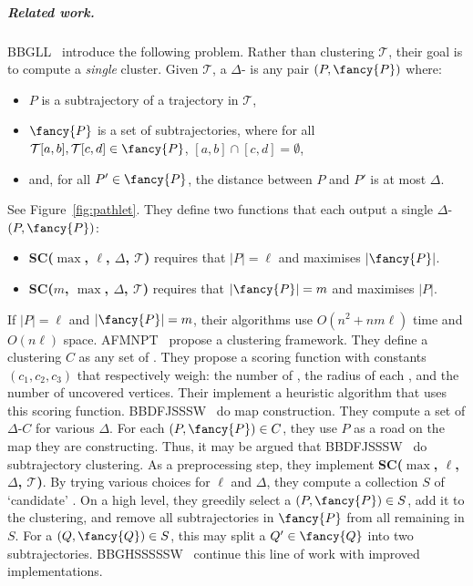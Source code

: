 %
\subparagraph{Related work. }
BBGLL~\cite{buchin2011detecting} introduce the following problem. 
Rather than clustering $\mathcal{T}$, their goal is to compute a \emph{single} cluster. Given $\mathcal{T}$,  a $\Delta$-\emph{\pathlet} is any pair $(P, {\fancy{P}})$ where:
%
\begin{itemize}
    \item $P$ is a subtrajectory of a trajectory in $\mathcal{T}$,
    \item ${\fancy{P}}$ is a set of subtrajectories, where for all $\mathcal{T}[a, b], \mathcal{T}[c, d] \in {\fancy{P}}$, $[a, b] \cap [c, d] = \emptyset$,
    \item and, for all $P' \in {\fancy{P}}$, the \frechet distance between $P$ and $P'$ is at most $\Delta$. 
\end{itemize}
%
See Figure~\ref{fig:pathlet}.
They define two functions that each output a single $\Delta$-\pathlet $(P, {\fancy{P}})$:
%
\begin{itemize}
    \item \textbf{SC($\max$, $\ell$, $\Delta$, $\mathcal{T}$)} requires that $|P| = \ell$ and maximises $|{\fancy{P}}|$.
    \item \textbf{SC($m$, $\max$, $\Delta$, $\mathcal{T}$)}  requires  that $|{\fancy{P}}| = m$ and maximises $|P|$. 
\end{itemize}
%
  If $|P| = \ell$ and $|{\fancy{P}}| = m$, their algorithms use $O(n^2 + n m \ell)$ time and $O(n \ell)$ space.
%
%
AFMNPT~\cite{agarwal2018subtrajectory} propose a clustering framework.
They define a clustering $C$ as any set of \pathlets.
They propose a scoring function with constants $(c_1, c_2, c_3)$ that respectively weigh: the number of \pathlets, the radius of each \pathlet, and the number of uncovered vertices. 
Their implement a heuristic algorithm that uses this scoring function.
%
BBDFJSSSW~\cite{buchin2017clustering} do map construction.
They compute a set of $\Delta$-\pathlets $C$ for various $\Delta$. 
For each $(P, {\fancy{P}}) \in C$, they use $P$ as a road on the map they are constructing. 
Thus, it may be argued that BBDFJSSSW~\cite{buchin2017clustering} do subtrajectory clustering. 
As a preprocessing step, they implement \textbf{SC($\max$, $\ell$, $\Delta$, $\mathcal{T}$)}. By trying various choices for $\ell$ and $\Delta$, they compute a collection $S$ of `candidate' \pathlets. 
On a high level, they greedily select a \pathlet $(P, {\fancy{P}}) \in S$, add it to the clustering, and remove all subtrajectories in ${\fancy{P}}$ from all remaining \pathlets in $S$. For a \pathlet $(Q, {\fancy{Q}}) \in S$, this may split a $Q' \in {\fancy{Q}}$ into two subtrajectories. BBGHSSSSSW~\cite{buchin2020improved} continue this line of work with improved implementations. 
